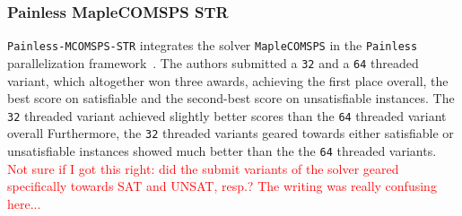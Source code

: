 \documentclass{elsarticle}
\makeatletter
\newcommand{\solver}[1]{\texttt{#1}}
\newcommand{\stack}[1]{%
\begin{tabular}{@{}l@{}}#1\checknextarg}
\newcommand{\checknextarg}{\@ifnextchar\bgroup{\gobblenextarg}{\end{tabular}}}
\newcommand{\gobblenextarg}[1]{\\#1\@ifnextchar\bgroup{\gobblenextarg}{\end{tabular}}}
\makeatother
\begin{document}


\subsubsection{Painless MapleCOMSPS STR} 

\solver{Painless-MCOMSPS-STR} integrates the solver \solver{MapleCOMSPS} in the \solver{Painless} parallelization framework~\cite{Frioux:2017:Painless,Liang:2017:Maplecomsps}. 
The authors submitted a \solver{32} and a \solver{64} threaded variant, which altogether won three awards, achieving
 the first place overall, the best score on satisfiable and the second-best score on unsatisfiable instances. 
The \solver{32} threaded variant achieved slightly better scores than the \solver{64} threaded variant overall
Furthermore, 
 the \solver{32} threaded variants geared towards either satisfiable or unsatisfiable instances 
showed much better  than the the \solver{64} threaded variants. \textcolor{red}{Not sure if I got this right: did the submit variants of the solver geared specifically towards SAT and UNSAT, resp.? The writing was really confusing here...}
\end{document}
